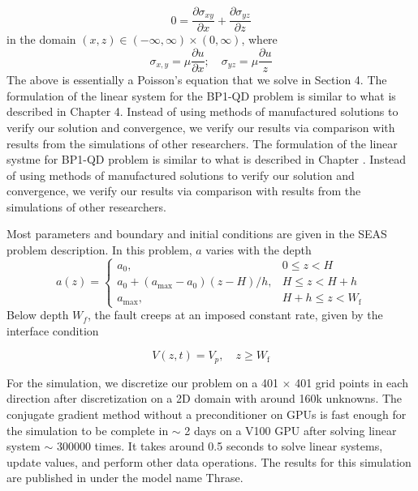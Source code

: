 \begin{equation}
    0 = \frac{\partial \sigma_{xy}}{\partial x} + \frac{\partial \sigma_{yz}}{\partial z}
\end{equation}
in the domain $(x,z) \in (-\infty, \infty) \times (0,\infty)$, where
\begin{equation}
    \sigma_{x,y} = \mu \frac{\partial u}{\partial x}; \quad \sigma_{yz} = \mu \frac{\partial u}{z}
\end{equation}
The above is essentially a Poisson's equation that we solve in Section 4.
The formulation of the linear system for the BP1-QD problem is similar to what is described in Chapter 4.
Instead of using methods of manufactured solutions to verify our solution and convergence, we verify our results via comparison with results from the simulations of other researchers.
The formulation of the linear systme for BP1-QD problem is similar to what is described in Chapter \label{chap:matrix-free}.
Instead of using methods of manufactured solutions to verify our solution and convergence, we verify our results via comparison with results from the simulations of other researchers.

Most parameters and boundary and initial conditions are given in the SEAS problem description. In this problem, $a$ varies with the depth
\begin{equation}
a(z) = 
\begin{cases} 
a_0, & 0 \leq z < H \\
a_0 + (a_{\text{max}} - a_0)(z - H)/h, & H \leq z < H + h \\
a_{\text{max}}, & H + h \leq z < W_\text{f} 
\end{cases}
\end{equation}
Below depth $W_f$, the fault creeps at an imposed constant rate, given by the interface condition

\begin{equation}
    V(z,t) = V_p, \quad z \geq W_\text{f}
\end{equation}

For the simulation, we discretize our problem on a 401 $\times$ 401 grid points in each direction after discretization on a 2D domain with around 160k unknowns. 
The conjugate gradient method without a preconditioner on GPUs is fast enough for the simulation to be complete in $\sim$ 2 days on a V100 GPU after solving linear system $\sim$ 300000 times.
It takes around 0.5 seconds to solve linear systems, update values, and perform other data operations.
The results for this simulation are published in \citep{erickson2023incorporating} under the model name Thrase.


